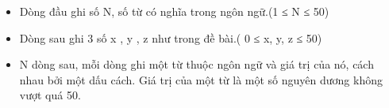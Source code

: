 \begin{itemize}
	\item Dòng đầu ghi số N, số từ có nghĩa trong ngôn ngữ.(1 ≤ N ≤ 50)
	\item Dòng sau ghi 3 số x , y , z như trong đề bài.( 0 ≤ x, y, z ≤ 50)
	\item N dòng sau, mỗi dòng ghi một từ thuộc ngôn ngữ và giá trị của nó, cách nhau bởi một dấu cách. Giá trị của một từ là một số nguyên dương không vượt quá 50.
\end{itemize}